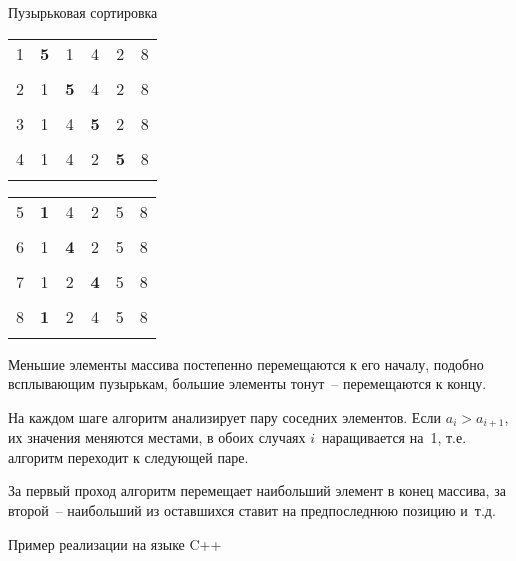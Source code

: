 \documentclass[landscape]{slides}
\begin{document}
\begin{slide}
  Пузырьковая сортировка
  \begin{center}
    \renewcommand{\b}[1]{\textbf{#1}}
    \begin{tabular}{l|c|c|c|c|c|}
      \hhline{~|-----}
      1&	\b{5}&  1&      4&      2&      8\\
      \hhline{~|-----}
      \multicolumn{6}{r}{}\\
      \hhline{~|-----}
      2&        1&      \b{5}&  4&      2&      8\\
      \hhline{~|-----}
      \multicolumn{6}{r}{}\\
      \hhline{~|-----}
      3&	1&      4&      \b{5}&  2&      8\\
      \hhline{~|-----}
      \multicolumn{6}{r}{}\\
      \hhline{~|-----}
      4&	1&      4&      2&      \b{5}&  8\\
      \hhline{~|-----}
    \end{tabular}
    \qquad
    \begin{tabular}{l|c|c|c|c|c|}
      \hhline{~|-----}
      5&	\b{1}&  4&      2&      5&      8\\
      \hhline{~|-----}
      \multicolumn{6}{r}{}\\
      \hhline{~|-----}
      6&        1&      \b{4}&  2&      5&      8\\
      \hhline{~|-----}
      \multicolumn{6}{r}{}\\
      \hhline{~|-----}
      7&        1&      2&      \b{4}&  5&      8\\
      \hhline{~|-----}
      \multicolumn{6}{r}{}\\
      \hhline{~|-----}
      8&        \b{1}&  2&      4&      5&      8\\
      \hhline{~|-----}
    \end{tabular}
  \end{center}
  Меньшие элементы массива постепенно перемещаются к его началу, подобно всплывающим пузырькам, большие элементы тонут~--
  перемещаются к концу.

  На каждом шаге алгоритм анализирует пару соседних элементов. Если $a_i>a_{i+1}$, их значения меняются местами, в обоих случаях
  $i$~наращивается на~1, т.е. алгоритм переходит к следующей паре.

  За первый проход алгоритм перемещает наибольший элемент в конец массива, за второй~-- наибольший из оставшихся ставит на
  предпоследнюю позицию и~т.д.
\end{slide}

\begin{slide}
  Пример реализации на языке C++
  
\end{slide}
\end{document}
